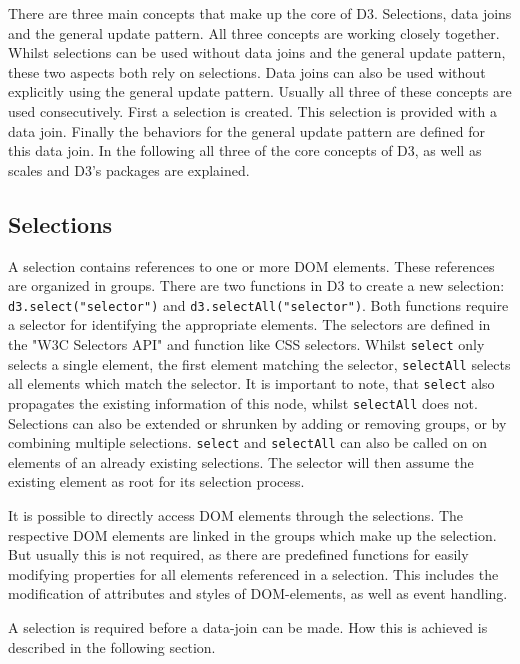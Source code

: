 There are three main concepts that make up the core of D3. Selections, data joins and the general update pattern. All three concepts are working closely together. Whilst selections can be used without data joins and the general update pattern, these two aspects both rely on selections. Data joins can also be used without explicitly using the general update pattern. Usually all three of these concepts are used consecutively. First a selection is created. This selection is provided with a data join. Finally the behaviors for the general update pattern are defined for this data join.
In the following all three of the core concepts of D3, as well as scales and D3's packages are explained.


\subsection{Selections}

A selection contains references to one or more DOM elements. These references are organized in groups. There are two functions in D3 to create a new selection: \verb|d3.select("selector")| and \verb|d3.selectAll("selector")|. Both functions require a selector for identifying the appropriate elements. The selectors are defined in the "W3C Selectors API"\cite{w3c_selectors_api} and function like CSS selectors. Whilst \verb|select| only selects a single element, the first element matching the selector, \verb|selectAll| selects all elements which match the selector. It is important to note, that \verb|select| also propagates the existing information of this node, whilst \verb|selectAll| does not. Selections can also be extended or shrunken by adding or removing groups, or by combining multiple selections. \verb|select| and \verb|selectAll| can also be called on on elements of an already existing selections. The selector will then assume the existing element as root for its selection process.

It is possible to directly access DOM elements through the selections. The respective DOM elements are linked in the groups which make up the selection. But usually this is not required, as there are predefined functions for easily modifying properties for all elements referenced in a selection. This includes the modification of attributes and styles of DOM-elements, as well as event handling.

A selection is required before a data-join can be made. How this is achieved is described in the following section.


